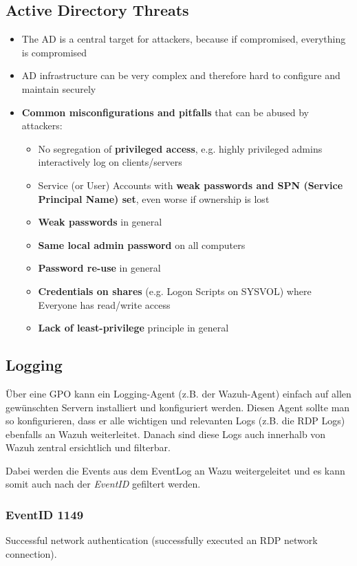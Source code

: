 \subsection{Active Directory Threats}
\begin{itemize}
    \item The AD is a central target for attackers, because if compromised, everything is compromised
    \item AD infrastructure can be very complex and therefore hard to configure and maintain securely
    \item \textbf{Common misconfigurations and pitfalls} that can be abused by attackers:
    \begin{itemize}
        \item No segregation of \textbf{privileged access}, e.g. highly privileged admins interactively log on clients/servers
        \item Service (or User) Accounts with \textbf{weak passwords and SPN (Service Principal Name) set}, even worse if ownership is lost
        \item \textbf{Weak passwords} in general
        \item \textbf{Same local admin password} on all computers
        \item \textbf{Password re-use} in general
        \item \textbf{Credentials on shares} (e.g. Logon Scripts on SYSVOL) where Everyone has read/write access
        \item \textbf{Lack of least-privilege} principle in general
    \end{itemize}
\end{itemize}


\subsection{Logging}
Über eine GPO kann ein Logging-Agent (z.B. der Wazuh-Agent) einfach auf allen gewünschten Servern installiert und konfiguriert werden.
Diesen Agent sollte man so konfigurieren, dass er alle wichtigen und relevanten Logs (z.B. die RDP Logs) ebenfalls an Wazuh weiterleitet.
Danach sind diese Logs auch innerhalb von Wazuh zentral ersichtlich und filterbar.

Dabei werden die Events aus dem EventLog an Wazu weitergeleitet und es kann somit auch nach der \textit{EventID} gefiltert werden.

\subsubsection{EventID 1149}
Successful network authentication (successfully executed an RDP network connection).

